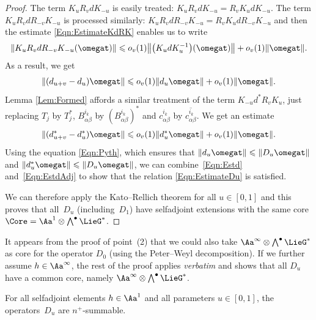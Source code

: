 \begin{proof}
The term $K_u R_v d K_{-u}$ is easily treated: $K_u R_v d K_{-u} = R_v K_u d K_{-u}$. The term $K_u R_v d R_{-v} K_{-u}$ is processed similarly: $ K_u R_v d R_{-v} K_{-u} = R_v K_u d R_{-v} K_{-u}$ and then the estimate \eqref{Eqn:EstimateKdRK} enables us to write
\begin{gather*}
\| K_u R_v d R_{-v} K_{-u}(\omegat) \| \leqslant o_v(1) \big\| \big(K_u d K_u^{-1}\big)(\omegat) \big\| + o_v(1) \| \omegat \|.
\end{gather*}
As a result, we get
\begin{gather}
\label{Eqn:Estd}
\| (d_{u+v} - d_u) \omegat \| \leqslant o_v(1) \| d_u \omegat \| + o_v(1) \| \omegat \|.
\end{gather}
Lemma \ref{Lem:Formed} af\/fords a similar treatment of the term $K_{-u} d^* R_v K_u $, just replacing $T_j$ by $T^*_j$, $B^{i_k}_{\alpha \beta}$ by $(B^{i_k}_{\alpha \beta})^*$ and $c^{i_k}_{\alpha \beta}$ by $\overline{c^{i_k}_{\alpha \beta}}$. We get an estimate
\begin{gather}
\label{Eqn:EstdAdj}
\| (d_{u+v}^* - d_u^*) \omegat \| \leqslant o_v(1) \| d_u^* \omegat \| + o_v(1) \| \omegat \|.
\end{gather}
Using the equation \eqref{Eqn:Pyth}, which ensures that $\| d_u \omegat \| \leqslant \| D_u \omegat \|$ and $\| d_u^* \omegat \| \leqslant \| D_u \omegat \|$, we can combine~\eqref{Eqn:Estd} and~\eqref{Eqn:EstdAdj} to show that the relation \eqref{Eqn:EstimateDu} is satisf\/ied.

We can therefore apply the Kato--Rellich theorem for all $u \in [0,1]$ and this proves that all~$D_u$ (including~$D_1$) have selfadjoint extensions with the same core $\Core = \Aa^1 \otimes \bigwedge^\bullet \LieG^*$.
\end{proof}

\begin{Remark}
\label{Rk:Domain}
It appears from the proof of point~(2) %
that we could also take $\Aa^\infty \otimes \bigwedge^\bullet \LieG^*$ as core for the operator $D_0$ (using the Peter--Weyl decomposition). If we further assume $h \in \Aa^\infty $, the rest of the proof applies \textit{verbatim} and shows that all $D_u$ have a common core, namely $\Aa^\infty \otimes \bigwedge^\bullet \LieG^*$.
\end{Remark}

\begin{Corollary}
\label{Cor:FiniteSumma}
For all selfadjoint elements $h \in \Aa^1$ and all parameters $u \in [0,1]$, the opera\-tors~$D_u$ are $n^+$-summable.
\end{Corollary}


